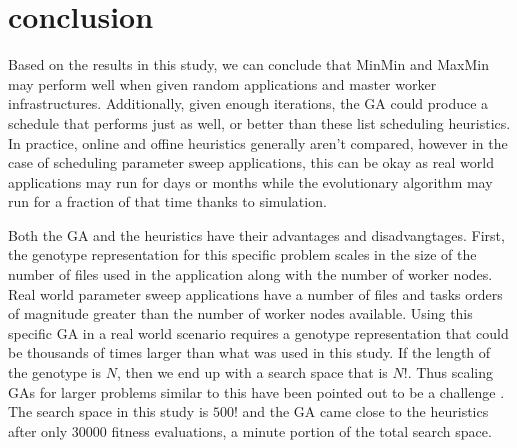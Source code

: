 \section{conclusion}
\label{sec:conclusion}
Based on the results in this study, we can conclude that MinMin and MaxMin
may perform well when given random applications and master worker
infrastructures. Additionally, given enough iterations, the GA could
produce a schedule that performs just as well, or better than these
list scheduling heuristics. In practice, online and offine heuristics
generally aren't compared, however in the case of scheduling parameter
sweep applications, this can be okay as real world applications may run
for days or months while the evolutionary algorithm may run for a fraction
of that time thanks to simulation.

Both the GA and the heuristics have their advantages and disadvangtages. First,
the genotype representation for this specific problem scales in the size of
the number of files used in the application along with the number of worker
nodes. Real world parameter sweep applications have a number of files and tasks
orders of magnitude greater than the number of worker nodes available. Using
this specific GA in a real world scenario requires a genotype representation
that could be thousands of times larger than what was used in this study.
If the length of the genotype is $N$, then we end up with a search space
that is $N!$. Thus scaling GAs for larger problems similar to this have
been pointed out to be a challenge \cite{wu-incremental-genetic-04}. The search
space in this study is $500!$ and the GA came close to the heuristics after
only 30000 fitness evaluations, a minute portion of the total search space.
